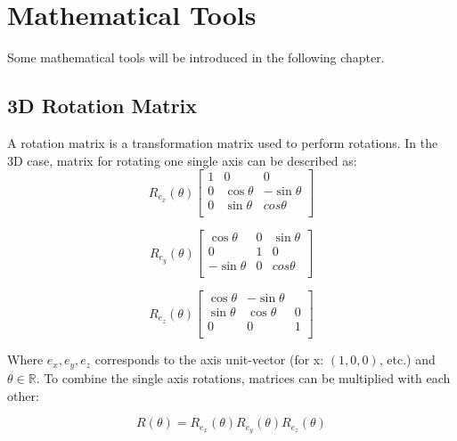 

\chapter{Mathematical Tools}
Some mathematical tools will be introduced in the following chapter.

\section{3D Rotation Matrix}
\label{app:3DrotationMatrix}
A rotation matrix is a transformation matrix used to perform rotations.
In the 3D case, matrix for rotating one single axis can be described as:
\begin{equation}
    R_{e_x} (\theta)
    \begin{bmatrix}
        1 & 0 & 0\\
        0 & \cos \theta & - \sin \theta \\
        0 & \sin \theta & cos \theta \\
    \end{bmatrix}
\end{equation}

\begin{equation}
    R_{e_y} (\theta)
    \begin{bmatrix}
        \cos \theta & 0 & \sin \theta\\
        0 & 1 & 0 \\
        - \sin \theta & 0 & cos \theta \\
    \end{bmatrix}
\end{equation}

\begin{equation}
    R_{e_z} (\theta)
    \begin{bmatrix}
        \cos \theta & - \sin \theta\\
        \sin \theta & \cos \theta & 0 \\
        0 & 0 & 1 \\
    \end{bmatrix}
\end{equation}

Where $e_x, e_y, e_z$ corresponds to the axis unit-vector (for x: $(1,0,0)$, etc.) and $\theta \in \mathbb{R}$.
To combine the single axis rotations, matrices can be multiplied with each other:

\begin{equation}
    \label{eq:3d-rotation}
    R (\theta) = R_{e_x} (\theta) R_{e_y} (\theta) R_{e_z} (\theta)
\end{equation}

